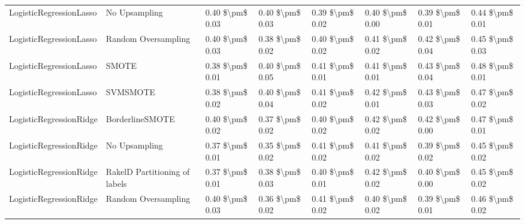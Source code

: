 \begin{tabular}{llllllll}
        LogisticRegressionLasso &                 No Upsampling & 0.40 \$\textbackslash pm\$ 0.03 &           0.40 \$\textbackslash pm\$ 0.03 &       0.39 \$\textbackslash pm\$ 0.02 &        0.40 \$\textbackslash pm\$ 0.00 &                         0.39 \$\textbackslash pm\$ 0.01 &     0.44 \$\textbackslash pm\$ 0.01 \\
        LogisticRegressionLasso &           Random Oversampling & 0.40 \$\textbackslash pm\$ 0.03 &           0.38 \$\textbackslash pm\$ 0.02 &       0.40 \$\textbackslash pm\$ 0.02 &        0.41 \$\textbackslash pm\$ 0.02 &                         0.42 \$\textbackslash pm\$ 0.04 &     0.45 \$\textbackslash pm\$ 0.03 \\
        LogisticRegressionLasso &                         SMOTE & 0.38 \$\textbackslash pm\$ 0.01 &           0.40 \$\textbackslash pm\$ 0.05 &       0.41 \$\textbackslash pm\$ 0.01 &        0.41 \$\textbackslash pm\$ 0.01 &                         0.43 \$\textbackslash pm\$ 0.04 &     0.48 \$\textbackslash pm\$ 0.01 \\
        LogisticRegressionLasso &                      SVMSMOTE & 0.38 \$\textbackslash pm\$ 0.02 &           0.40 \$\textbackslash pm\$ 0.04 &       0.41 \$\textbackslash pm\$ 0.02 &        0.42 \$\textbackslash pm\$ 0.01 &                         0.43 \$\textbackslash pm\$ 0.03 &     0.47 \$\textbackslash pm\$ 0.02 \\
        LogisticRegressionRidge &               BorderlineSMOTE & 0.40 \$\textbackslash pm\$ 0.02 &           0.37 \$\textbackslash pm\$ 0.02 &       0.40 \$\textbackslash pm\$ 0.02 &        0.42 \$\textbackslash pm\$ 0.02 &                         0.42 \$\textbackslash pm\$ 0.00 &     0.47 \$\textbackslash pm\$ 0.01 \\
        LogisticRegressionRidge &                 No Upsampling & 0.37 \$\textbackslash pm\$ 0.01 &           0.35 \$\textbackslash pm\$ 0.02 &       0.41 \$\textbackslash pm\$ 0.02 &        0.41 \$\textbackslash pm\$ 0.02 &                         0.39 \$\textbackslash pm\$ 0.02 &     0.45 \$\textbackslash pm\$ 0.02 \\
        LogisticRegressionRidge & RakelD Partitioning of labels & 0.37 \$\textbackslash pm\$ 0.01 &           0.38 \$\textbackslash pm\$ 0.03 &       0.40 \$\textbackslash pm\$ 0.01 &        0.42 \$\textbackslash pm\$ 0.02 &                         0.40 \$\textbackslash pm\$ 0.00 &     0.45 \$\textbackslash pm\$ 0.02 \\
        LogisticRegressionRidge &           Random Oversampling & 0.40 \$\textbackslash pm\$ 0.03 &           0.36 \$\textbackslash pm\$ 0.02 &       0.41 \$\textbackslash pm\$ 0.02 &        0.40 \$\textbackslash pm\$ 0.02 &                         0.39 \$\textbackslash pm\$ 0.01 &     0.46 \$\textbackslash pm\$ 0.02 \\

\end{tabular}
